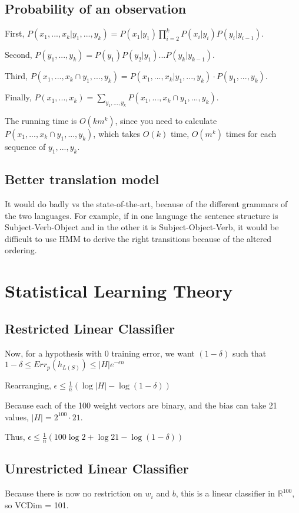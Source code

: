 \documentclass[]{article}
\begin{document}
\subsection{Probability of an observation}

First, $P(x_1,...,x_k|y_1,...,y_k) = P(x_1|y_1) \prod_{i=2}^k P(x_i|y_i)P(y_i|y_{i-1})$.

Second, $P(y_1,...,y_k) = P(y_1)P(y_2|y_1)...P(y_k|y_{k-1})$.

Third, $P(x_1,...,x_k \cap y_1,...,y_k) = P(x_1,...,x_k|y_1,...,y_k) \cdot P(y_1,...,y_k)$.

Finally, $P(x_1,...,x_k) = \sum_{y_1,...,y_k} P(x_1,...,x_k \cap y_1,...,y_k)$.

The running time is $O(km^k)$, since you need to calculate $P(x_1,...,x_k \cap y_1,...,y_k)$, which takes $O(k)$ time, $O(m^k)$ times for each sequence of $y_1,...,y_k$.

\subsection{Better translation model}

It would do badly vs the state-of-the-art, because of the different grammars of the two languages. For example, if in one language the sentence structure is Subject-Verb-Object and in the other it is Subject-Object-Verb, it would be difficult to use HMM to derive the right transitions because of the altered ordering.

\section{Statistical Learning Theory}

\subsection{Restricted Linear Classifier}

Now, for a hypothesis with 0 training error, we want $(1-\delta)$ such that $1-\delta \le Err_p(h_{L(S)}) \le |H|e^{-\epsilon n}$

Rearranging, $\epsilon \le \frac{1}{n}(\log |H| - \log (1-\delta))$

Because each of the 100 weight vectors are binary, and the bias can take 21 values, $|H| = 2^{100} \cdot 21$.

Thus, $\epsilon \le \frac{1}{n} (100 \log 2 + \log 21 - \log(1-\delta))$

\subsection{Unrestricted Linear Classifier}
Because there is now no restriction on $w_i$ and $b$, this is a linear classifier in $\mathbb{R}^{100}$, so VCDim = 101.
\end{document}
